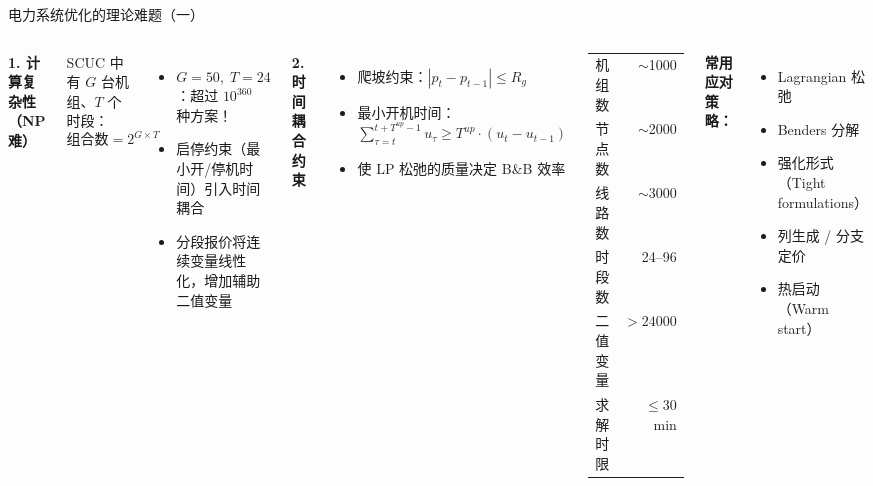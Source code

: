 \documentclass[10pt,aspectratio=169]{beamer}
\begin{document}
\begin{frame}{电力系统优化的理论难题（一）}
  \begin{columns}[T]
    \textbf{1. 计算复杂性（NP难）}

    SCUC 中有 $G$ 台机组、$T$ 个时段：
    \[
      \text{组合数} = 2^{G \times T}
    \]
    \begin{itemize}
      \item $G=50,\; T=24$：超过 $10^{360}$ 种方案！
      \item 启停约束（最小开/停机时间）引入时间耦合
      \item 分段报价将连续变量线性化，增加辅助二值变量
    \end{itemize}

    \vspace{6pt}
    \textbf{2. 时间耦合约束}
    \begin{itemize}
      \item 爬坡约束：$|p_t - p_{t-1}| \le R_g$
      \item 最小开机时间：$\sum_{\tau=t}^{t+T^{up}-1} u_\tau \ge T^{up} \cdot (u_t - u_{t-1})$
      \item 使 LP 松弛的质量决定 B\&B 效率
    \end{itemize}

    \begin{tcolorbox}[mybox,title=实际规模（华东电网示例）]
      \footnotesize
      \begin{tabular}{@{}lr@{}}
        机组数      & $\sim$1000 \\
        节点数      & $\sim$2000 \\
        线路数      & $\sim$3000 \\
        时段数      & 24--96 \\
        二值变量    & $> 24000$ \\
        求解时限    & $\le 30$~min \\
      \end{tabular}
    \end{tcolorbox}

    \vspace{8pt}
    \textbf{常用应对策略：}
    \begin{itemize}
      \item Lagrangian 松弛
      \item Benders 分解
      \item 强化形式（Tight formulations）
      \item 列生成 / 分支定价
      \item 热启动（Warm start）
    \end{itemize}
  \end{columns}
\end{frame}
\end{document}

